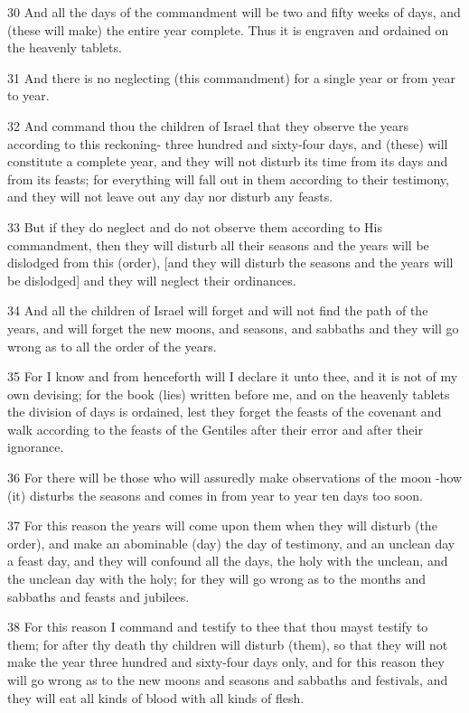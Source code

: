 \par 30 And all the days of the commandment will be two and fifty weeks of days, and (these will make) the entire year complete. Thus it is engraven and ordained on the heavenly tablets.
\par 31 And there is no neglecting (this commandment) for a single year or from year to year.
\par 32 And command thou the children of Israel that they observe the years according to this reckoning- three hundred and sixty-four days, and (these) will constitute a complete year, and they will not disturb its time from its days and from its feasts; for everything will fall out in them according to their testimony, and they will not leave out any day nor disturb any feasts.
\par 33 But if they do neglect and do not observe them according to His commandment, then they will disturb all their seasons and the years will be dislodged from this (order), [and they will disturb the seasons and the years will be dislodged] and they will neglect their ordinances.
\par 34 And all the children of Israel will forget and will not find the path of the years, and will forget the new moons, and seasons, and sabbaths and they will go wrong as to all the order of the years.
\par 35 For I know and from henceforth will I declare it unto thee, and it is not of my own devising; for the book (lies) written before me, and on the heavenly tablets the division of days is ordained, lest they forget the feasts of the covenant and walk according to the feasts of the Gentiles after their error and after their ignorance.
\par 36 For there will be those who will assuredly make observations of the moon -how (it) disturbs the seasons and comes in from year to year ten days too soon.
\par 37 For this reason the years will come upon them when they will disturb (the order), and make an abominable (day) the day of testimony, and an unclean day a feast day, and they will confound all the days, the holy with the unclean, and the unclean day with the holy; for they will go wrong as to the months and sabbaths and feasts and jubilees.
\par 38 For this reason I command and testify to thee that thou mayst testify to them; for after thy death thy children will disturb (them), so that they will not make the year three hundred and sixty-four days only, and for this reason they will go wrong as to the new moons and seasons and sabbaths and festivals, and they will eat all kinds of blood with all kinds of flesh.

